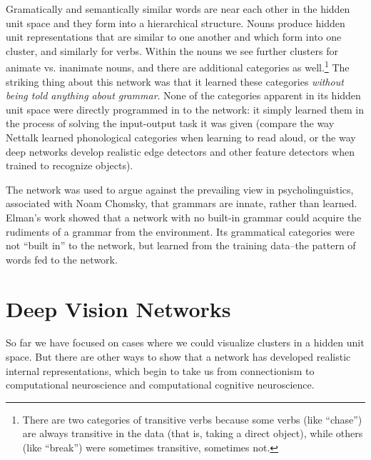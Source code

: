 Gramatically and semantically similar words are near each other in the hidden unit space and they form into a hierarchical structure. Nouns produce hidden unit representations that are similar to one another and which form into one cluster, and similarly for verbs. Within the nouns we see further clusters for animate vs. inanimate nouns, and there are additional categories as well.\footnote{There are two categories of transitive verbs because some verbs (like ``chase'') are always transitive in the data (that is, taking a direct object), while others (like ``break'') were sometimes transitive, sometimes not.}  The striking thing about this network was that it learned these categories \emph{without being told anything about grammar}. None of the categories apparent in its hidden unit space were directly programmed in to the network: it simply learned them in the process of solving the input-output task it was given (compare the way Nettalk learned phonological categories when learning to read aloud, or the way deep networks develop realistic edge detectors and other feature detectors when trained to recognize objects). 

The network was used to argue against the prevailing view in psycholinguistics, associated with Noam Chomsky, that  grammars are innate, rather than learned.  Elman's work showed that a network with no built-in grammar could acquire the rudiments of a grammar from the environment. Its grammatical categories were not ``built in'' to the network, but learned from the training data--the pattern of words fed to the network.

\section{Deep Vision Networks}

So far we have focused on cases where we could visualize clusters in a hidden unit space. But there are other ways to show that a network has developed realistic internal representations, which begin to take us from connectionism to computational neuroscience and computational cognitive neuroscience.

